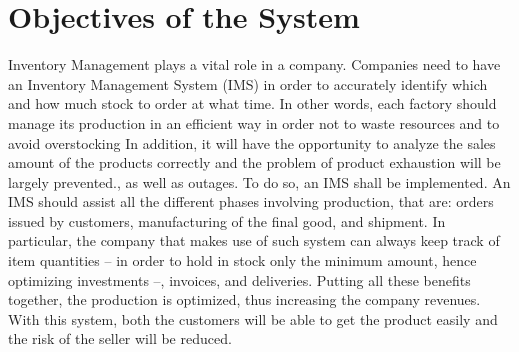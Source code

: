\section{Objectives of the System}
Inventory Management plays a vital role in a company. Companies need to have an Inventory Management System (IMS) in order to accurately identify which and how much stock to order at what time. In other words, each factory should manage its production in an efficient way in order not to waste resources and to avoid overstocking In addition, it will have the opportunity to analyze the sales amount of the products correctly and the problem of product exhaustion will be largely prevented., as well as outages. To do so, an IMS shall be implemented. An IMS should assist all the different phases involving production, that are: orders issued by customers, manufacturing of the final good, and shipment. In particular, the company that makes use of such system can always keep track of item quantities -- in order to hold in stock only the minimum amount, hence optimizing investments --, invoices, and deliveries. Putting all these benefits together, the production is optimized, thus increasing the company revenues.\\
With this system, both the customers will be able to get the product easily and the risk of the seller will be reduced.